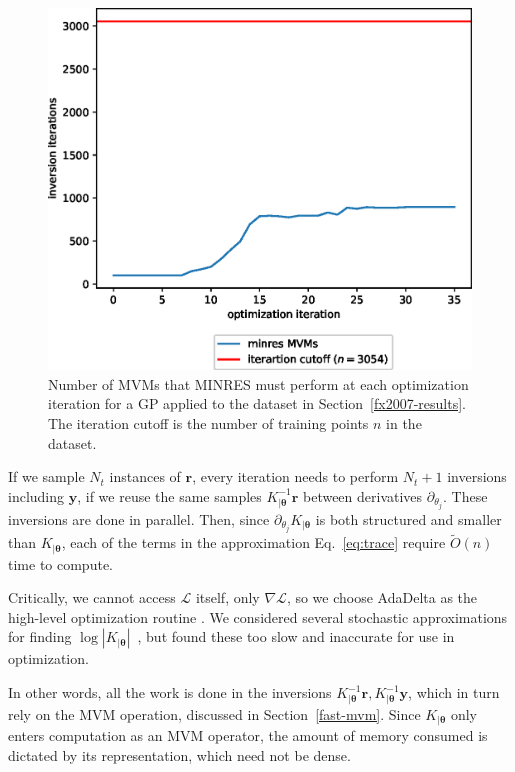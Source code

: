 \documentclass{article}
\def\bsth{{\boldsymbol\theta}}
\def \mcL {\mathcal{L}}
\def\Ty{\textbf{y}}
\def\tbr{\textbf{r}}
\newcommand{\abs}[1]{\left|#1\right|}
\begin{document}
\begin{figure}[!ht]
\vskip 0.2in
\begin{center}
\centerline{\includegraphics[width=\columnwidth]{iterations.eps}}
\caption{Number of MVMs that MINRES must perform at each optimization iteration for a GP applied to the dataset in Section~\ref{fx2007-results}. The iteration cutoff is the number of training points $n$ in the dataset.
} %
\label{fx2007-iterations}
\end{center}
\vskip -0.2in
\end{figure}

If we sample $N_t$ instances of $\tbr$, every iteration needs to perform $N_t+1$ inversions including $\Ty$, if we reuse the same samples $K_{|\bsth}^{-1}\tbr$ between derivatives $\partial_{\theta_j}$. These inversions are done in parallel. Then, since $\partial_{\theta_j}K_{|\bsth}$ is both structured and smaller than $K_{|\bsth}$, each of the terms in the approximation Eq.~\ref{eq:trace} require $\tilde{O}(n)$ time to compute.

Critically, we cannot access $\mcL$ itself, only $\nabla\mcL$, so we choose AdaDelta as the high-level optimization routine \cite{zeiler2012adadelta}. We considered several stochastic approximations for finding $\log\abs{K_{|\bsth}}$~\cite{dorn2015stochastic, han2015large}, but found these too slow and inaccurate for use in optimization.

In other words, all the work is done in the inversions $K_{|\bsth}^{-1}\tbr,K_{|\bsth}^{-1}\Ty$, which in turn rely on the MVM operation, discussed in Section~\ref{fast-mvm}. Since $K_{|\bsth}$ only enters computation as an MVM operator, the amount of memory consumed is dictated by its representation, which need not be dense. %
\end{document}
